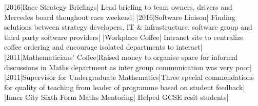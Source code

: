 \documentclass[a4paper,10pt]{article}
\begin{document}

\begin{cvsection}[Communication]
  |2016|Race Strategy Briefings| Lead briefing to team owners, drivers
  and Mercedes board thoughout race weekend|
  |2016|Software Liaison| Finding solutions between strategy developers,
  IT \& infrastructure, software group and third party software providers|
  |Workplace Coffee| Intranet site to centralize coffee ordering and
  encourage isolated departments to interact|
  |2011|Mathematicians' Coffee|Raised money to organise space for informal discussions in
  Maths department as inter group communication was very poor|
  |2011|Supervisor for Undergraduate Mathematics|Three special
  commendations for quality of teaching from leader of programme based on
  student feedback|
  |Inner City Sixth Form Maths Mentoring| Helped GCSE resit students|
\end{cvsection}
\end{document}
